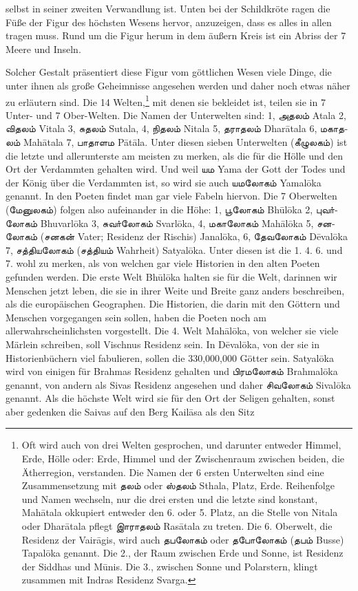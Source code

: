 \documentclass{article}
\newcommand{\TamilText}[1]{\texttamil{#1}}
\newcommand{\tam}[1]{\TamilText{#1}}
\begin{document}
selbst in seiner zweiten Verwandlung ist. Unten bei der Schildkröte ragen die Füße der Figur des höchsten Wesens hervor, anzuzeigen, dass es alles in allen tragen muss. Rund um die Figur herum in dem äußern Kreis ist ein Abriss der 7 Meere und Inseln.

Solcher Gestalt präsentiert diese Figur vom göttlichen Wesen viele Dinge, die unter ihnen als große Geheimnisse angesehen werden und daher noch etwas näher zu erläutern sind. Die 14 Welten,\footnote{Oft wird auch von drei Welten gesprochen, und darunter entweder Himmel, Erde, Hölle oder: Erde, Himmel und der Zwischenraum zwischen beiden, die Ätherregion, verstanden. Die Namen der 6 ersten Unterwelten sind eine Zusammensetzung mit \tam{தலம்} oder \tam{ஸ்தலம்} Sthala, Platz, Erde. Reihenfolge und Namen wechseln, nur die drei ersten und die letzte sind konstant, Mah\={a}tala okkupiert entweder den 6. oder 5. Platz, an die Stelle von Nitala oder Dhar\={a}tala pflegt \tam{இாராதலம்} Ras\={a}tala zu treten. Die 6. Oberwelt, die Residenz der Vair\={a}gis, wird auch \tam{தபலோகம்} oder \tam{தபோலோகம்} (\tam{தபம்} Busse) Tapal\={o}ka genannt. Die 2., der Raum zwischen Erde und Sonne, ist Residenz der Siddhas und M\={u}nis. Die 3., zwischen Sonne und Polarstern, klingt zusammen mit Indras Residenz Svarga.} mit denen sie bekleidet ist, teilen sie in 7 Unter- und 7 Ober-Welten. Die Namen der Unterwelten sind: 1, \tam{அதலம்} Atala 2, \tam{விதலம்} Vitala 3, \tam{சுதலம்} Sutala, 4, \tam{நிதலம்} Nitala 5, \tam{தராதலம்} Dhar\={a}tala 6, \tam{மகாதலம்} Mah\={a}tala 7, \tam{பாதாளம} P\={a}t\={a}la. Unter diesen sieben Unterwelten (\tam{கீழுலகம்}) ist die letzte und allerunterste am meisten zu merken, als die für die Hölle und den Ort der Verdammten gehalten wird. Und weil \tam{யம} Yama der Gott der Todes und der König über die Verdammten ist, so wird sie auch \tam{யமலோகம்} Yamal\={o}ka genannt. In den Poeten findet man gar viele Fabeln hiervon. Die 7 Oberwelten (\tam{மேனுலகம்}) folgen also aufeinander in die Höhe: 1, \tam{பூலோகம்} Bh\={u}l\={o}ka 2, \tam{புவா்லோகம்} Bhuvarl\={o}ka 3, \tam{சுவா்லோகம்} Svarl\={o}ka, 4, \tam{மகாலோகம்} Mah\={a}l\={o}ka 5, \tam{சனலோகம்} (\tam{சனகன்} Vater; Residenz der Rischis) Janal\={o}ka, 6, \tam{தேவலோகம்} D\={e}val\={o}ka 7, \tam{சத்தியலோகம்} (\tam{சத்தியம்} Wahrheit) Satyal\={o}ka. Unter diesen ist die 1. 4. 6. und 7. wohl zu merken, als von welchen gar viele Historien in den alten Poeten gefunden werden. Die erste Welt Bh\={u}l\={o}ka halten sie für die Welt, darinnen wir Menschen jetzt leben, die sie in ihrer Weite und Breite ganz anders beschreiben, als die europäischen Geographen. Die Historien, die darin mit den Göttern und Menschen vorgegangen sein sollen, haben die Poeten noch am allerwahrscheinlichsten vorgestellt. Die 4. Welt Mah\={a}l\={o}ka, von welcher sie viele Märlein schreiben, soll Vischnus Residenz sein. In D\={e}val\={o}ka, von der sie in Historienbüchern viel fabulieren, sollen die 330,000,000 Götter sein. Satyal\={o}ka wird von einigen für Brahmas Residenz gehalten und \tam{பிரமலோகம்} Brahmal\={o}ka genannt, von andern als Sivas Residenz angesehen und daher \tam{சிவலோகம்} Sival\={o}ka genannt. Als die höchste Welt wird sie für den Ort der Seligen gehalten, sonst aber gedenken die Saivas auf den Berg Kail\={a}sa als den Sitz 
\end{document}
